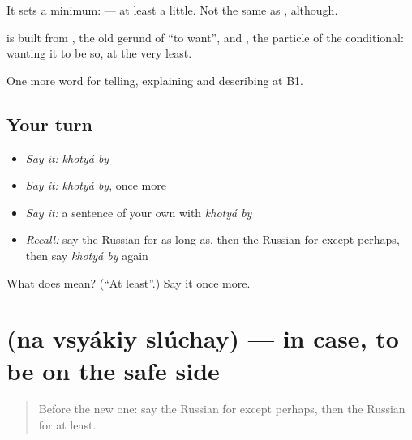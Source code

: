 It sets a minimum: \emph{  } — at least a little. Not the same as \emph{}, although.

\begin{cousinweb}
\textbf{ } is built from \emph{}, the old gerund of \emph{} \textquotedblleft{}to want\textquotedblright{}, and \emph{}, the particle of the conditional: wanting it to be so, at the very least.
\end{cousinweb}

\begin{grammarlens}[title={What you've built}]
One more word for telling, explaining and describing at B1.
\end{grammarlens}

\subsection*{Your turn}
\begin{itemize}
\raggedright
  \item \emph{Say it:} \emph{khotyá by}
  \item \emph{Say it:} \emph{khotyá by}, once more
  \item \emph{Say it:} a sentence of your own with \emph{khotyá by}
  \item \emph{Recall:} say the Russian for as long as, then the Russian for except perhaps, then say \emph{khotyá by} again
\end{itemize}

\begin{tcolorbox}[breakable,colback=teal!4,colframe=teal!35!black,title={Before you move on}]
What does   mean? (\textquotedblleft{}At least\textquotedblright{}.) Say it once more.
\end{tcolorbox}
\section[\texorpdfstring{\ru{на} \ru{всякий} \ru{случай} (na vsyákiy slúchay)}{на всякий случай (na vsyákiy slúchay)}]{   (na vsyákiy slúchay) — in case, to be on the safe side}

\label{lesson:RU-C376-na-vsyakiy-sluchay}



\begin{quote}
Before the new one: say the Russian for except perhaps, then the Russian for at least.
\end{quote}

